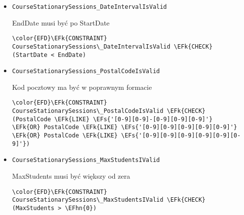 \documentclass[11pt]{article}
\newcommand{\EFs}[1]{\textcolor{EFs}{#1}} %
\newcommand{\EFk}[1]{\textcolor{EFk}{\textbf{#1}}} %
\newcommand{\EFhn}[1]{\textcolor{EFhn}{#1}} %
\begin{document}
\begin{itemize}
\item \texttt{CourseStationarySessions\_DateIntervalIsValid}

EndDate musi być po StartDate
\begin{Code}
\begin{Verbatim}
\color{EFD}\EFk{CONSTRAINT} CourseStationarySessions\_DateIntervalIsValid \EFk{CHECK}
(StartDate < EndDate)
\end{Verbatim}
\end{Code}
\item \texttt{CourseStationarySessions\_PostalCodeIsValid}

Kod pocztowy ma być w poprawnym formacie
\begin{Code}
\begin{Verbatim}
\color{EFD}\EFk{CONSTRAINT} CourseStationarySessions\_PostalCodeIsValid \EFk{CHECK}
(PostalCode \EFk{LIKE} \EFs{'[0-9][0-9]-[0-9][0-9][0-9]'}
\EFk{OR} PostalCode \EFk{LIKE} \EFs{'[0-9][0-9][0-9][0-9][0-9]'}
\EFk{OR} PostalCode \EFk{LIKE} \EFs{'[0-9][0-9][0-9][0-9][0-9][0-9]'})
\end{Verbatim}
\end{Code}
\item \texttt{CourseStationarySessions\_MaxStudentsIValid}

MaxStudents musi być większy od zera
\begin{Code}
\begin{Verbatim}
\color{EFD}\EFk{CONSTRAINT} CourseStationarySessions\_MaxStudentsIValid \EFk{CHECK}
(MaxStudents > \EFhn{0})
\end{Verbatim}
\end{Code}
\end{itemize}
\end{document}
